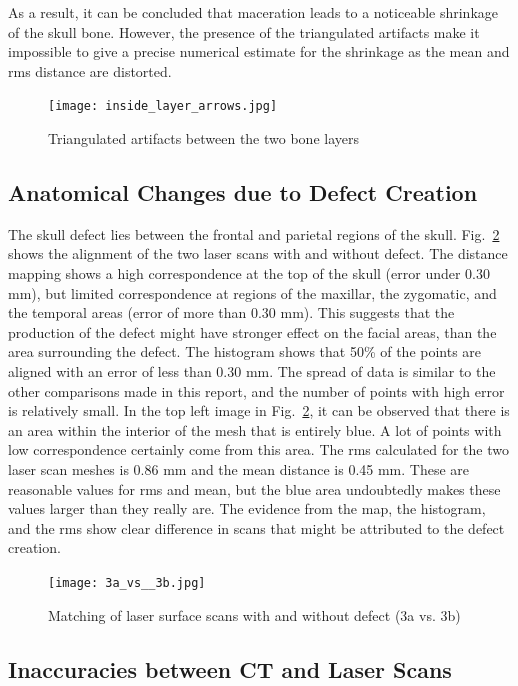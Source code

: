 \documentclass[a4paper]{article}
\begin{document}
As a result, it can be concluded that maceration leads to a noticeable shrinkage of the skull bone. However, the presence of the triangulated artifacts make it impossible to give a precise numerical estimate for the shrinkage as the mean and rms distance are distorted.

\begin{figure}[!ht]
\centering
\texttt{[image: inside\_layer\_arrows.jpg]}
\caption{\label{fig:1b_vs_2a_artifacts}Triangulated artifacts between the two bone layers}
\end{figure}

\pagebreak
\subsection{Anatomical Changes due to Defect Creation} %
The skull defect lies between the frontal and parietal regions of the skull. Fig.~\ref{fig:3a_vs_3b} shows the alignment of the two laser scans with and without defect. The distance mapping shows a high correspondence at the top of the skull (error under 0.30 mm), but limited correspondence at regions of the maxillar, the zygomatic, and the temporal areas (error of more than 0.30 mm). This suggests that the production of the defect might have stronger effect on the facial areas, than the area surrounding the defect. The histogram shows that 50\% of the points are aligned with an error of less than 0.30 mm. The spread of data is similar to the other comparisons made in this report, and the number of points with high error is relatively small. In the top left image in Fig.~\ref{fig:3a_vs_3b}, it can be observed that there is an area within the interior of the mesh that is entirely blue. A lot of points with low correspondence certainly come from this area. The rms calculated for the two laser scan meshes is 0.86 mm and the mean distance is 0.45 mm. These are reasonable values for rms and mean, but the blue area undoubtedly makes these values larger than they really are. The evidence from the map, the histogram, and the rms show clear difference in scans that might be attributed to the defect creation.
\vspace{2cm}
\begin {figure} [ht!]
\centering
\texttt{[image: 3a\_vs\_\_3b.jpg]}
\caption{\label{fig:3a_vs_3b}Matching of laser surface scans with and without defect (3a vs. 3b)}
\end{figure}
\pagebreak
\subsection{Inaccuracies between CT and Laser Scans} %
\end{document}
